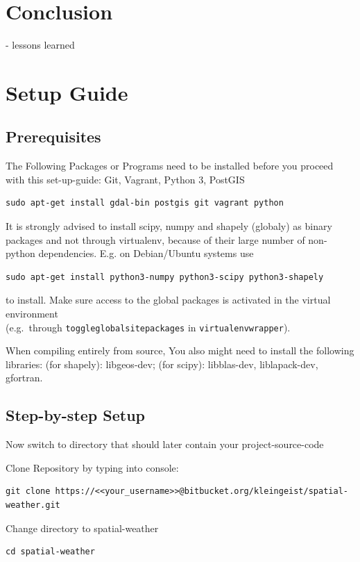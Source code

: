 \documentclass[paper=a4, fontsize=11pt]{scrartcl} %
\numberwithin{equation}{section} %
\numberwithin{figure}{section} %
\numberwithin{table}{section} %
\begin{document}
\section{Conclusion}
	- lessons learned

\section{Setup Guide}
\subsection{Prerequisites}

The Following Packages or Programs need to be installed before you proceed with this set-up-guide: Git, Vagrant, Python 3, PostGIS

\begin{lstlisting}
sudo apt-get install gdal-bin postgis git vagrant python
\end{lstlisting}

It is strongly advised to install scipy, numpy and shapely (globaly) as
binary packages and not through virtualenv, because of their large
number of non-python dependencies. E.g. on Debian/Ubuntu systems use
\begin{lstlisting}
sudo apt-get install python3-numpy python3-scipy python3-shapely
\end{lstlisting}
to install. Make sure access to the global packages is activated in the
virtual environment\\(e.g.~through \texttt{toggleglobalsitepackages} in
\texttt{virtualenvwrapper}).

When compiling entirely from source, You also might need to install the
following libraries: (for shapely): libgeos-dev; (for scipy):
libblas-dev, liblapack-dev, gfortran.

\subsection{Step-by-step Setup}
Now switch to directory that should later contain your project-source-code

Clone Repository by typing into console:
\begin{lstlisting}
git clone https://<<your_username>>@bitbucket.org/kleingeist/spatial-weather.git
\end{lstlisting}

Change directory to spatial-weather
\begin{lstlisting}
cd spatial-weather
\end{lstlisting}
\end{document}
